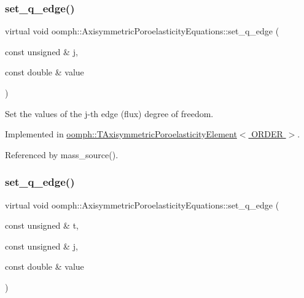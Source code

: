 \subsubsection{\texorpdfstring{set\+\_\+q\+\_\+edge()}{set\_q\_edge()}\hspace{0.1cm}{\footnotesize\ttfamily [1/2]}}
{\footnotesize\ttfamily virtual void oomph\+::\+Axisymmetric\+Poroelasticity\+Equations\+::set\+\_\+q\+\_\+edge (\begin{DoxyParamCaption}\item[{const unsigned \&}]{j,  }\item[{const double \&}]{value }\end{DoxyParamCaption})\hspace{0.3cm}{\ttfamily [pure virtual]}}



Set the values of the j-\/th edge (flux) degree of freedom. 



Implemented in \hyperlink{classoomph_1_1TAxisymmetricPoroelasticityElement_aadc0873c12a2d059f49b4a2d85ec054b}{oomph\+::\+T\+Axisymmetric\+Poroelasticity\+Element$<$ O\+R\+D\+E\+R $>$}.



Referenced by mass\+\_\+source().

\mbox{\label{classoomph_1_1AxisymmetricPoroelasticityEquations_a30a9883e688ff91b78407b2e42e92d95}} 
\subsubsection{\texorpdfstring{set\+\_\+q\+\_\+edge()}{set\_q\_edge()}\hspace{0.1cm}{\footnotesize\ttfamily [2/2]}}
{\footnotesize\ttfamily virtual void oomph\+::\+Axisymmetric\+Poroelasticity\+Equations\+::set\+\_\+q\+\_\+edge (\begin{DoxyParamCaption}\item[{const unsigned \&}]{t,  }\item[{const unsigned \&}]{j,  }\item[{const double \&}]{value }\end{DoxyParamCaption})\hspace{0.3cm}{\ttfamily [pure virtual]}}



